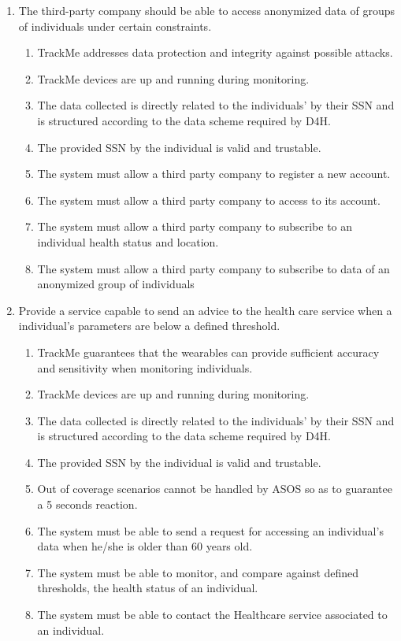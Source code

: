 \documentclass[12pt]{report}
\newcommand\requirement[1]{\item[{[R#1]}] }
\newcommand\goal[1]{\item[{[G#1]}] }
\newcommand\assumption[1]{\item[{[D#1]}] }
\begin{document}
\begin{enumerate}
   \goal{4} The third-party company should be able to access anonymized data of groups of individuals under certain constraints.
    \begin{enumerate}
      \assumption{2} TrackMe addresses data protection and integrity against possible attacks.
      \assumption{3} TrackMe devices are up and running during monitoring.
      \assumption{4} The data collected is directly related to the individuals' by their SSN and is structured according to the data scheme required by D4H.
      \assumption{5} The provided SSN by the individual is valid and trustable.
      \requirement{5} The system must allow a third party company to register a new account.
      \requirement{6} The system must allow a third party company to access to its account.
      \requirement{11} The system must allow a third party company to subscribe to an individual health status and location.
      \requirement{12} The system must allow a third party company to subscribe to data of an anonymized group of individuals
    \end{enumerate}

   \goal{5} Provide a service capable to send an advice to the health care service when a individual's parameters are below a defined threshold.
    \begin{enumerate}
      \assumption{1} TrackMe guarantees that the wearables can provide sufficient accuracy and sensitivity when monitoring individuals.
      \assumption{3} TrackMe devices are up and running during monitoring.
      \assumption{4} The data collected is directly related to the individuals' by their SSN and is structured according to the data scheme required by D4H.
      \assumption{5} The provided SSN by the individual is valid and trustable.
	  \assumption{6} Out of coverage scenarios cannot be handled by ASOS so as to guarantee a 5 seconds reaction.
      \requirement{13} The system must be able to send a request for accessing an individual's data when he/she is older than 60 years old.
      \requirement{14} The system must be able to monitor, and compare against defined thresholds, the health status of an individual.
      \requirement{15} The system must be able to contact the Healthcare service associated to an individual.      
  \end{enumerate}
  

\end{enumerate}
\end{document}
